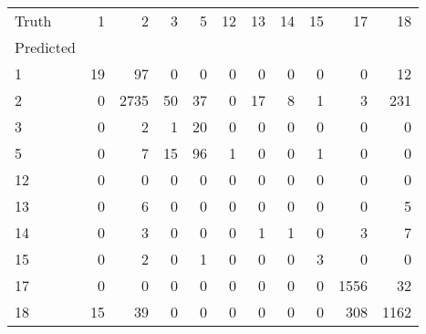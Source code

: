 \begin{tabular}{lrrrrrrrrrr}
\toprule
Truth & 1 & 2 & 3 & 5 & 12 & 13 & 14 & 15 & 17 & 18 \\
Predicted &  &  &  &  &  &  &  &  &  &  \\
\midrule
1 & 19 & 97 & 0 & 0 & 0 & 0 & 0 & 0 & 0 & 12 \\
2 & 0 & 2735 & 50 & 37 & 0 & 17 & 8 & 1 & 3 & 231 \\
3 & 0 & 2 & 1 & 20 & 0 & 0 & 0 & 0 & 0 & 0 \\
5 & 0 & 7 & 15 & 96 & 1 & 0 & 0 & 1 & 0 & 0 \\
12 & 0 & 0 & 0 & 0 & 0 & 0 & 0 & 0 & 0 & 0 \\
13 & 0 & 6 & 0 & 0 & 0 & 0 & 0 & 0 & 0 & 5 \\
14 & 0 & 3 & 0 & 0 & 0 & 1 & 1 & 0 & 3 & 7 \\
15 & 0 & 2 & 0 & 1 & 0 & 0 & 0 & 3 & 0 & 0 \\
17 & 0 & 0 & 0 & 0 & 0 & 0 & 0 & 0 & 1556 & 32 \\
18 & 15 & 39 & 0 & 0 & 0 & 0 & 0 & 0 & 308 & 1162 \\
\bottomrule
\end{tabular}
